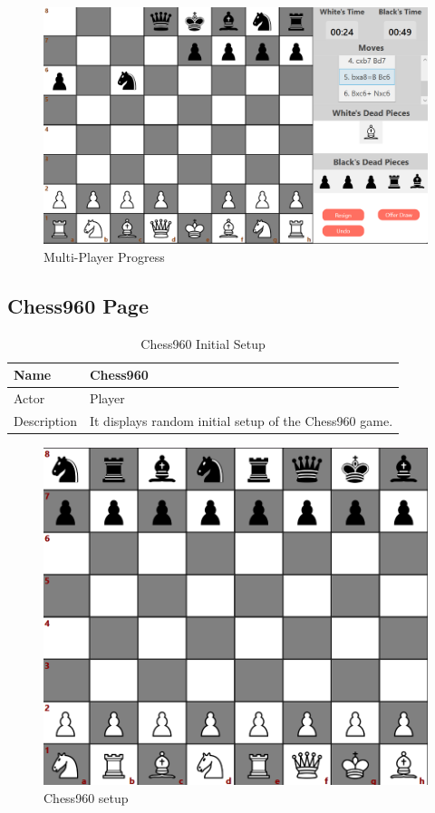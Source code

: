 \documentclass[a4paper,12pt]{article}
\begin{document}
\begin{figure}[H]
    \centering
    \includegraphics[width=0.8\linewidth]{Images/Use Cases/multiplayerProgress.png}
    \caption{Multi-Player Progress}
    \label{fig:multiplayerProgress}
\end{figure}

\subsection{Chess960 Page}

\begin{longtable}{|m{}|m{}|}
    \caption{Chess960 Initial Setup} \\
    \hline
    Name & Chess960 \\
    \hline
    Actor & Player \\
    \hline
        Description & It displays random initial setup of the Chess960 game.\\ 
    \hline
\end{longtable}

\begin{figure}[H]
    \centering
    \includegraphics[width=0.7\linewidth]{Images/Use Cases/chess960setup.png}
    \caption{Chess960 setup}
    \label{fig:chess960Setup}
\end{figure}
\end{document}
